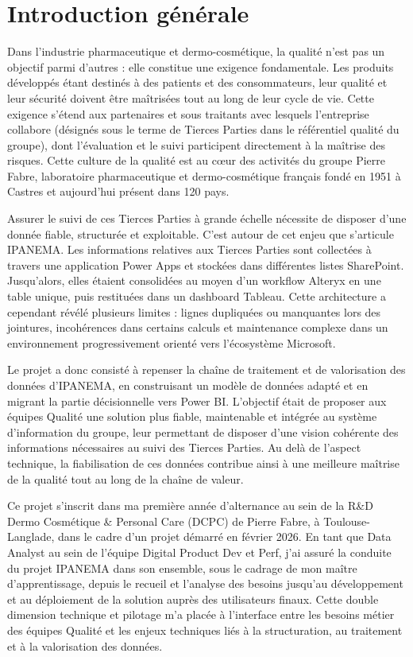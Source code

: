 \chapter*{\textbf{Introduction générale}}
\label{intro}
\indent Dans l'industrie pharmaceutique et dermo-cosmétique, la qualité n'est pas un objectif 
parmi d'autres : elle constitue une exigence fondamentale. Les produits développés étant 
destinés à des patients et des consommateurs, leur qualité et leur sécurité doivent être 
maîtrisées tout au long de leur cycle de vie. Cette exigence s'étend aux partenaires et sous
traitants avec lesquels l'entreprise collabore (désignés sous le terme de Tierces Parties dans 
le référentiel qualité du groupe), dont l'évaluation et le suivi participent directement à la maîtrise 
des risques. Cette culture de la qualité est au cœur des activités du groupe Pierre Fabre, 
laboratoire pharmaceutique et dermo-cosmétique français fondé en 1951 à Castres et 
aujourd'hui présent dans 120 pays. 

\indent Assurer le suivi de ces Tierces Parties à grande échelle nécessite de disposer d'une 
donnée fiable, structurée et exploitable. C'est autour de cet enjeu que s'articule IPANEMA. 
Les informations relatives aux Tierces Parties sont collectées à travers une application Power 
Apps et stockées dans différentes listes SharePoint. Jusqu'alors, elles étaient consolidées au 
moyen d'un workflow Alteryx en une table unique, puis restituées dans un dashboard Tableau. 
Cette architecture a cependant révélé plusieurs limites : lignes dupliquées ou manquantes lors 
des jointures, incohérences dans certains calculs et maintenance complexe dans un 
environnement progressivement orienté vers l'écosystème Microsoft.

\indent Le projet a donc consisté à repenser la chaîne de traitement et de valorisation des 
données d'IPANEMA, en construisant un modèle de données adapté et en migrant la partie 
décisionnelle vers Power BI. L'objectif était de proposer aux équipes Qualité une solution plus 
fiable, maintenable et intégrée au système d'information du groupe, leur permettant de 
disposer d'une vision cohérente des informations nécessaires au suivi des Tierces Parties. Au
delà de l'aspect technique, la fiabilisation de ces données contribue ainsi à une meilleure 
maîtrise de la qualité tout au long de la chaîne de valeur.

\indent Ce projet s'inscrit dans ma première année d'alternance au sein de la R\&D Dermo
Cosmétique \& Personal Care (DCPC) de Pierre Fabre, à Toulouse-Langlade, dans le cadre 
d'un projet démarré en février 2026. En tant que Data Analyst au sein de l'équipe Digital 
Product Dev et Perf, j'ai assuré la conduite du projet IPANEMA dans son ensemble, sous le 
cadrage de mon maître d'apprentissage, depuis le recueil et l'analyse des besoins jusqu'au 
développement et au déploiement de la solution auprès des utilisateurs finaux. Cette double 
dimension technique et pilotage m'a placée à l'interface entre les besoins métier des équipes 
Qualité et les enjeux techniques liés à la structuration, au traitement et à la valorisation des 
données.

